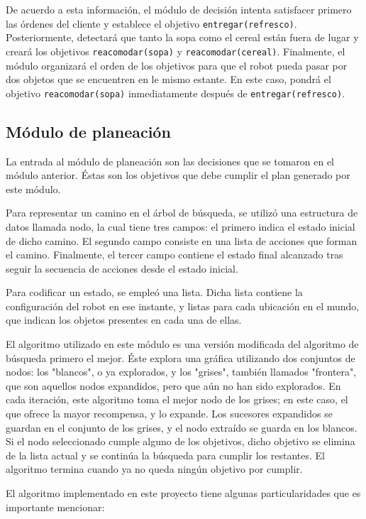 \documentclass[11pt]{article}
\begin{document}
De acuerdo a esta información, el módulo de decisión intenta satisfacer primero las órdenes del cliente y establece el objetivo \texttt{entregar(refresco)}. Posteriormente, detectará que tanto la sopa como el cereal están fuera de lugar y creará los objetivos \texttt{reacomodar(sopa)} y \texttt{reacomodar(cereal)}. Finalmente, el módulo organizará el orden de los objetivos para que el robot pueda pasar por dos objetos que se encuentren en le mismo estante. En este caso, pondrá el objetivo \texttt{reacomodar(sopa)} inmediatamente después de \texttt{entregar(refresco)}.

\subsection{Módulo de planeación}

La entrada al módulo de planeación son las decisiones que se tomaron en el módulo anterior. Éstas son los objetivos que debe cumplir el plan generado por este módulo.

Para representar un camino en el árbol de búsqueda, se utilizó una estructura de datos llamada nodo, la cual tiene tres campos: el primero indica el estado inicial de dicho camino. El segundo campo consiste en una lista de acciones que forman el camino. Finalmente, el tercer campo contiene el estado final alcanzado tras seguir la secuencia de acciones desde el estado inicial.

Para codificar un estado, se empleó una lista. Dicha lista contiene la configuración del robot en ese instante, y listas para cada ubicación en el mundo, que indican los objetos presentes en cada una de ellas.

El algoritmo utilizado en este módulo es una versión modificada del algoritmo de búsqueda primero el mejor. Éste explora una gráfica utilizando dos conjuntos de nodos: los "blancos", o ya explorados, y los "grises", también llamados "frontera", que son aquellos nodos expandidos, pero que aún no han sido explorados. En cada iteración, este algoritmo toma el mejor nodo de los grises; en este caso, el que ofrece la mayor recompensa, y lo expande. Los sucesores expandidos se guardan en el conjunto de los grises, y el nodo extraído se guarda en los blancos. Si el nodo seleccionado cumple alguno de los objetivos, dicho objetivo se elimina de la lista actual y se continúa la búsqueda para cumplir los restantes. El algoritmo termina cuando ya no queda ningún objetivo por cumplir.

El algoritmo implementado en este proyecto tiene algunas particularidades que es importante mencionar:
\end{document}
